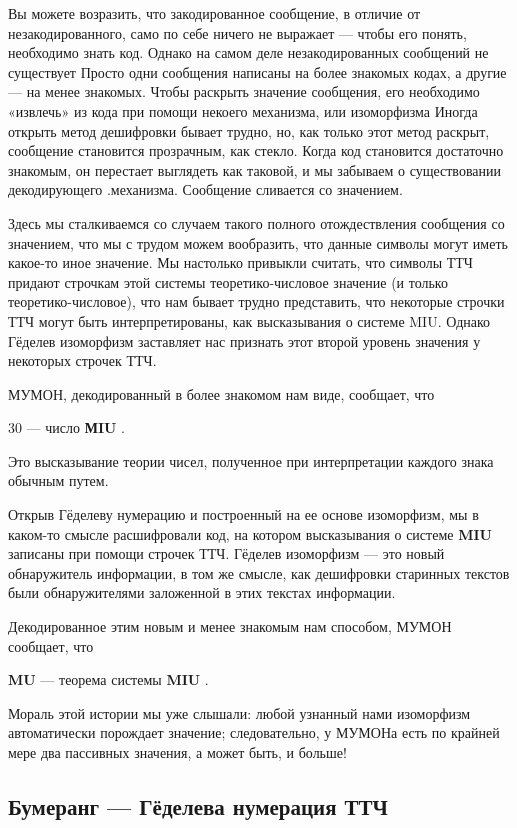 \documentclass[../main.tex]{subfiles}
\begin{document}
Вы можете возразить, что закодированное сообщение, в отличие от незакодированного, само по себе ничего не выражает --- чтобы его понять, необходимо знать код. Однако на самом деле незакодированных сообщений не существует Просто одни сообщения написаны на более знакомых кодах, а другие --- на менее знакомых. Чтобы раскрыть значение сообщения, его необходимо «извлечь» из кода при помощи некоего механизма, или изоморфизма Иногда открыть метод дешифровки бывает трудно, но, как только этот метод раскрыт, сообщение становится прозрачным, как стекло. Когда код становится достаточно знакомым, он перестает выглядеть как таковой, и мы забываем о существовании декодирующего .механизма. Сообщение сливается со значением.

Здесь мы сталкиваемся со случаем такого полного отождествления сообщения со значением, что мы с трудом можем вообразить, что данные символы могут иметь какое-то иное значение. Мы настолько привыкли считать, что символы ТТЧ придают строчкам этой системы теоретико-числовое значение (и только теоретико-числовое), что нам бывает трудно представить, что некоторые строчки ТТЧ могут быть интерпретированы, как высказывания о системе MIU. Однако Гёделев изоморфизм заставляет нас признать этот второй уровень значения у некоторых строчек ТТЧ.

МУМОН, декодированный в более знакомом нам виде, сообщает, что

30 --- число \textbf{МIU} .

Это высказывание теории чисел, полученное при интерпретации каждого знака обычным путем.

Открыв Гёделеву нумерацию и построенный на ее основе изоморфизм, мы в каком-то смысле расшифровали код, на котором высказывания о системе \textbf{MIU} записаны при помощи строчек ТТЧ. Гёделев изоморфизм --- это новый обнаружитель информации, в том же смысле, как дешифровки старинных текстов были обнаружителями заложенной в этих текстах информации.

Декодированное этим новым и менее знакомым нам способом, МУМОН сообщает, что

\textbf{MU} --- теорема системы \textbf{MIU} .

Мораль этой истории мы уже слышали: любой узнанный нами изоморфизм автоматически порождает значение; следовательно, у МУМОНа есть по крайней мере два пассивных значения, а может быть, и больше!


\subsection{Бумеранг --- Гёделева нумерация ТТЧ}
\end{document}
